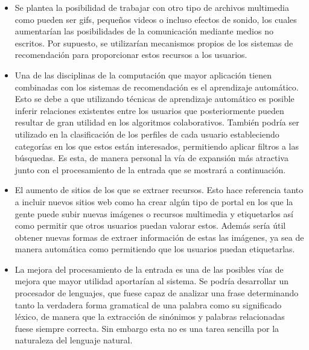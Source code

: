 \begin{itemize}
\item Se plantea la posibilidad de trabajar con otro tipo de archivos multimedia como pueden ser gifs, pequeños videos o incluso efectos de sonido, los cuales aumentarían las posibilidades de la comunicación mediante medios no escritos. Por supuesto, se utilizarían mecanismos propios de los sistemas de recomendación para proporcionar estos recursos a los usuarios.
\item Una de las disciplinas de la computación que mayor aplicación tienen combinadas con los sistemas de recomendación es el aprendizaje automático. Esto se debe a que utilizando técnicas de aprendizaje automático es posible inferir relaciones existentes entre los usuarios que posteriormente pueden resultar de gran utilidad en los algoritmos colaborativos. También podría ser utilizado en la clasificación de los perfiles de cada usuario estableciendo categorías en los que estos están interesados, permitiendo aplicar filtros a las búsquedas. Es esta, de manera personal la vía de expansión más atractiva junto con el procesamiento de la entrada que se mostrará a continuación.
\item El aumento de sitios de los que se extraer recursos. Esto hace referencia tanto a incluir nuevos sitios web como ha crear algún tipo de portal en los que la gente puede subir nuevas imágenes o recursos multimedia y etiquetarlos así como permitir que otros usuarios puedan valorar estos. Además sería útil obtener nuevas formas de extraer información de estas las imágenes, ya sea de manera automática como permitiendo que los usuarios puedan etiquetarlas.
\item La mejora del procesamiento de la entrada es una de las posibles vías de mejora que mayor utilidad aportarían al sistema. Se podría desarrollar un procesador de lenguajes, que fuese capaz de analizar una frase determinando tanto la verdadera forma gramatical de una palabra como su significado léxico, de manera que la extracción de sinónimos y palabras relacionadas fuese siempre correcta. Sin embargo esta no es una tarea sencilla por la naturaleza del lenguaje natural.
\end{itemize}













































